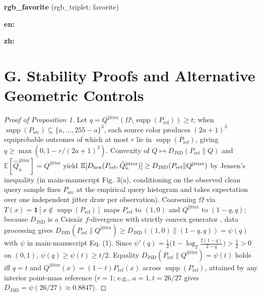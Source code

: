 \textbf{rgb\_favorite} (rgb\_triplet; favorite)


{\raggedright\noindent\textbf{en:}\par}


{\raggedright\noindent\textbf{zh:}\par}


\section*{G. Stability Proofs and Alternative Geometric Controls}

\begin{proof}[Proof of Proposition 1]

Let $q=Q^{\mathrm{jitter}}(\Omega\setminus\operatorname{supp}(P_{\mathrm{ref}}))\ge t$; when $\operatorname{supp}(P_{\mathrm{src}})\subseteq\{a,\ldots,255-a\}^3$, each source color produces $(2a+1)^3$ equiprobable outcomes of which at most $r$ lie in $\operatorname{supp}(P_{\mathrm{ref}})$, giving $q\ge\max(0,1-r/(2a+1)^3)$. Convexity of $Q\mapsto D_{\mathrm{JSD}}(P_{\mathrm{ref}}\|Q)$ \cite{ref26} and $\mathbb E[\hat Q_n^{\mathrm{jitter}}]=Q^{\mathrm{jitter}}$ yield $\mathbb E[D_{\mathrm{hex}}{}(P_{\mathrm{ref}},\hat Q_n^{\mathrm{jitter}})]\ge D_{\mathrm{JSD}}(P_{\mathrm{ref}}\|Q^{\mathrm{jitter}})$ by Jensen's inequality (in main-manuscript Fig. 3(a), conditioning on the observed clean query sample fixes $P_{\mathrm{src}}$ at the empirical query histogram and takes expectation over one independent jitter draw per observation). Coarsening $\Omega$ via $T(x)=\mathbf 1[x\notin\operatorname{supp}(P_{\mathrm{ref}})]$ maps $P_{\mathrm{ref}}$ to $(1,0)$ and $Q^{\mathrm{jitter}}$ to $(1-q,q)$; because $D_{\mathrm{JSD}}$ is a Csisz\'{a}r $f$-divergence with strictly convex generator \cite{ref33}, data processing gives $D_{\mathrm{JSD}}(P_{\mathrm{ref}}\|Q^{\mathrm{jitter}})\ge D_{\mathrm{JSD}}((1,0)\|(1-q,q))=\psi(q)$ with $\psi$ in main-manuscript Eq. (1). Since $\psi'(q)=\tfrac12\big(1-\log_2\tfrac{2(1-q)}{2-q}\big)>\tfrac12>0$ on $(0,1)$, $\psi(q)\ge\psi(t)\ge t/2$. Equality $D_{\mathrm{JSD}}(P_{\mathrm{ref}}\|Q^{\mathrm{jitter}})=\psi(t)$ holds iff $q=t$ and $Q^{\mathrm{jitter}}(x)=(1-t)P_{\mathrm{ref}}(x)$ across $\operatorname{supp}(P_{\mathrm{ref}})$, attained by any interior point-mass reference ($r=1$; e.g., $a=1, t=26/27$ gives $D_{\mathrm{JSD}}=\psi(26/27)\approx 0.8847$).\end{proof}

